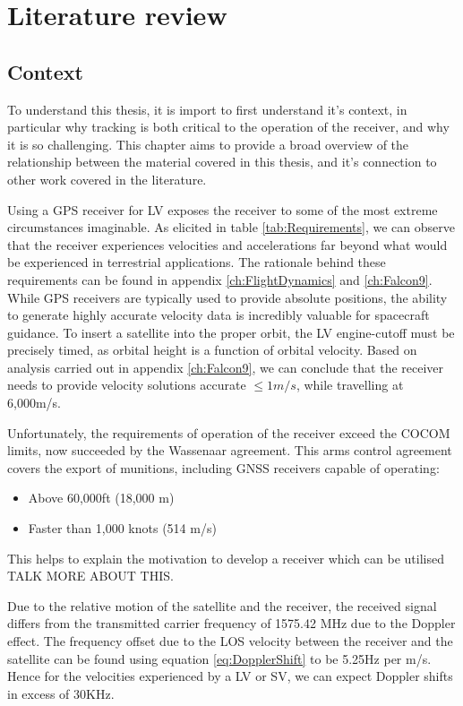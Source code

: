 \chapter{Literature review}\label{ch:LitReview}

\section{Context}
To understand this thesis, it is import to first understand it's context, in particular why tracking is both critical to the operation of the receiver, and why it is so challenging. This chapter aims to provide a broad overview of the relationship between the material covered in this thesis, and it's connection to other work covered in the literature. 

Using a GPS receiver for \ac{LV} exposes the receiver to some of the most extreme circumstances imaginable. As elicited in table \ref{tab:Requirements}, we can observe that the receiver experiences velocities and accelerations far beyond what would be experienced in terrestrial applications. The rationale behind these requirements can be found in appendix \ref{ch:FlightDynamics} and \ref{ch:Falcon9}. 
While \ac{GPS} receivers are typically used to provide absolute positions, the ability to generate highly accurate velocity data is incredibly valuable for spacecraft guidance. To insert a satellite into the proper orbit, the \ac{LV} engine-cutoff must be precisely timed, as orbital height is a function of orbital velocity. Based on analysis carried out in appendix \ref{ch:Falcon9}, we can conclude that the receiver needs to provide velocity solutions accurate $\leq 1m/s$, while travelling at 6,000m/s.



Unfortunately, the requirements of operation of the receiver exceed the \ac{COCOM} limits, now succeeded by the Wassenaar agreement. This arms control agreement covers the export of munitions, including GNSS receivers capable of operating:

\begin{itemize}
\item{Above 60,000ft (18,000 m)}
\item{Faster than 1,000 knots (514 m/s) }
\end{itemize}

This helps to explain the motivation to develop a receiver which can be utilised TALK MORE ABOUT THIS.


Due to the relative motion of the satellite and the receiver, the received signal differs from the transmitted carrier frequency of 1575.42 MHz due to the Doppler effect\cite{Tsui}. The frequency offset due to the \ac{LOS} velocity between the receiver and the satellite can be found using equation \ref{eq:DopplerShift} to be 5.25Hz per m/s. Hence for the velocities experienced by a  \ac{LV} or \ac{SV}, we can expect Doppler shifts in excess of 30KHz.

